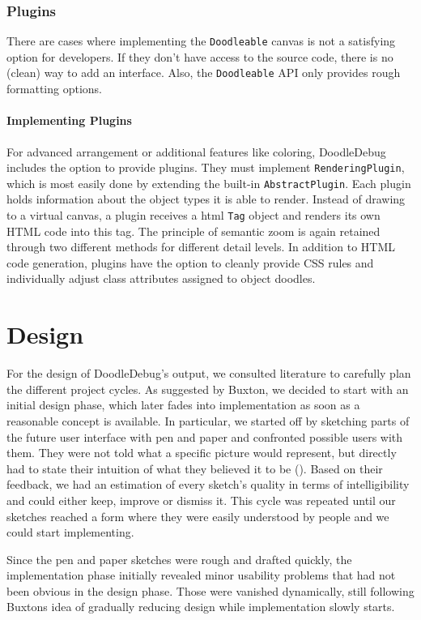 \documentclass[english]{scrartcl}
\newcommand{\nb}[2]{\nbc{#1}{#2}{orange}}
\newcommand\todo[1]{\nb{TO DO}{#1}}
\newcommand{\DD}{Dood\-le\-De\-bug\xspace}
\begin{document}
\subsubsection{Plugins}
There are cases where implementing the \texttt{Doodleable} canvas is not a satisfying option for developers.
If they don't have access to the source code, there is no (clean) way to add an interface.
Also, the \texttt{Doodleable} API only provides rough formatting options.

\paragraph{Implementing Plugins}
For advanced arrangement or additional features like coloring, \DD includes the option to provide plugins.
They must implement \texttt{RenderingPlugin}, which is most easily done by extending the built-in \texttt{AbstractPlugin}.
Each plugin holds information about the object types it is able to render.
Instead of drawing to a virtual canvas, a plugin receives a html \texttt{Tag} object and renders its own HTML code into this tag.
The principle of semantic zoom is again retained through two different methods for different detail levels.
In addition to HTML code generation, plugins have the option to cleanly provide CSS rules and individually adjust class attributes assigned to object doodles.


\section{Design}
For the design of \DD's output, we consulted literature to carefully plan the different project cycles.
As suggested by Buxton\cite{?}\todo{citation}, we decided to start with an initial design phase, which later fades into implementation as soon as a reasonable concept is available.
In particular, we started off by sketching parts of the future user interface with pen and paper and confronted possible users with them.
They were not told what a specific picture would represent, but directly had to state their intuition of what they believed it to be ().
Based on their feedback, we had an estimation of every sketch's quality in terms of intelligibility and could either keep, improve or dismiss it.
This cycle was repeated until our sketches reached a form where they were easily understood by people and we could start implementing.

Since the pen and paper sketches were rough and drafted quickly, the implementation phase initially revealed minor usability problems that had not been obvious in the design phase.
Those were vanished dynamically, still following Buxtons idea of gradually reducing design while implementation slowly starts.
\end{document}
